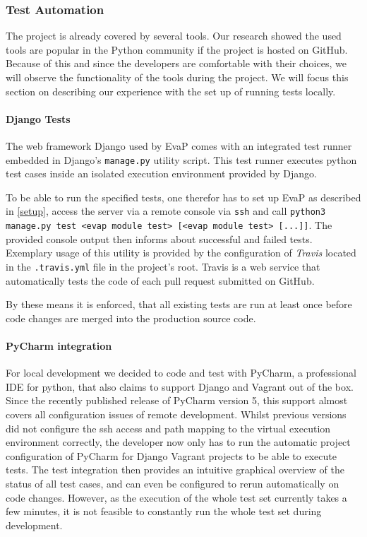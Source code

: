 \subsubsection{Test Automation}
The project is already covered by several tools.
Our research showed the used tools are popular in the Python community if the project is hosted on GitHub.
Because of this and since the developers are comfortable with their choices, we will observe the functionality of the tools during the project.
We will focus this section on describing our experience with the set up of running tests locally.

\paragraph{Django Tests}
The web framework Django used by EvaP comes with an integrated test runner embedded in Django's \texttt{manage.py} utility script.
This test runner executes python test cases inside an isolated execution environment provided by Django.

To be able to run the specified tests, one therefor has to set up EvaP as described in \autoref{setup}, access the server via a remote console via \texttt{ssh} and call \texttt{python3 manage.py test <evap module test> [<evap module test> [...]]}.
The provided console output then informs about successful and failed tests.
Exemplary usage of this utility is provided by the configuration of \textit{Travis} located in the \texttt{.travis.yml} file in the project's root.
Travis is a web service that automatically tests the code of each pull request submitted on GitHub.

By these means it is enforced, that all existing tests are run at least once before code changes are merged into the production source code.

\paragraph{PyCharm integration}
For local development we decided to code and test with PyCharm, a professional IDE for python, that also claims to support Django and Vagrant out of the box.
Since the recently published release of PyCharm version 5, this support almost covers all configuration issues of remote development.
Whilst previous versions did not configure the ssh access and path mapping to the virtual execution environment correctly, the developer now only has to run the automatic project configuration of PyCharm for Django Vagrant projects to be able to execute tests.
The test integration then provides an intuitive graphical overview of the status of all test cases, and can even be configured to rerun automatically on code changes.
However, as the execution of the whole test set currently takes a few minutes, it is not feasible to constantly run the whole test set during development.

